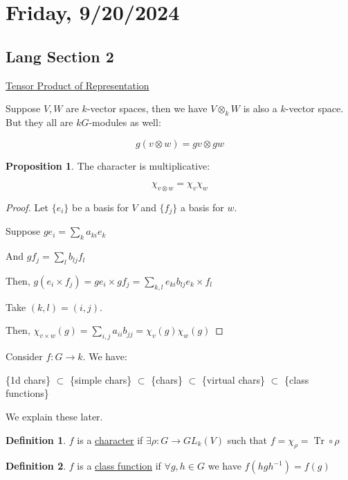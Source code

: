 \documentclass{article}
\theoremstyle{definition}
\newtheorem*{definition}{Definition}
\newtheorem{proposition}[theorem]{Proposition}
\newcommand{\Tr}{\operatorname{Tr}}
\begin{document}
\section*{Friday, 9/20/2024}

\subsection*{Lang Section 2}

\underline{Tensor Product of Representation} 

Suppose \(V,W\) are \(k\)-vector spaces, then we have \(V \otimes _ k W\) is also a \(k\)-vector space. But they all are \(kG\)-modules as well:

\[
    g(v \otimes w) = gv \otimes gw
\]

\begin{proposition}
    The character is multiplicative:

    \[
        \chi _{v \otimes w} = \chi _v \chi _w
    \]
\end{proposition}

\begin{proof}
    Let \(\{ e_i \} \) be a basis for \(V\) and \(\{ f_j \} \) a basis for \(w\).

    Suppose \(g e_i = \sum_{k} a_{ki} e_k\) 

    And \(g f_j = \sum_{l} b_{lj} f_l\)
    
    Then, \(g(e_i \times f_j) = ge_i \times gf_j = \sum_{k,l} e_{ki}b_{lj} e_k \times f_l\)
    
    Take \((k,l) = (i,j)\).

    Then, \(\chi_{v \times w} (g) = \sum_{i,j} a_{i i} b_{j j} = \chi_v(g) \chi_w(g) \) 
\end{proof}

Consider \(f : G \to k\). We have:

\{1d chars\} \(\subset\) \{simple chars\} \(\subset\) \{chars\} \(\subset\) \{virtual chars\} \(\subset\) \{class functions\}

We explain these later.

\begin{definition}
    \(f\) is a \underline{character} if \(\exists \rho : G \to GL_k(V)\) such that \(f = \chi_{\rho} = \Tr \circ \rho\) 
\end{definition}

\begin{definition}
    \(f\) is a \underline{class function} if \(\forall g, h \in G\) we have \(f(h g h ^{-1}) = f(g)\)
\end{definition}
\end{document}
